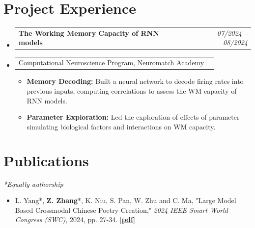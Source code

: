 \documentclass[letterpaper,11pt]{article}
\makeatletter
\newcommand{\link}[2]{\href{#1}{\textcolor{Linkblue}{\textbf{#2}}}}
\newcommand{\resumeItem}[1]{
  \item{
    {\normalsize#1 \vspace{-2pt}}
  }
}
\newcommand{\resumeProjectHeading}[2]{
    \item
    \begin{tabular*}{0.97\textwidth}{l@{\extracolsep{\fill}}r}
       #1 & \textit{#2} \\
    \end{tabular*}\vspace{-7pt}
}
\newcommand{\resumeSubHeadingListStart}{\vspace{0pt}\begin{itemize}[leftmargin=0.15in, label={}]}
\newcommand{\resumeSubHeadingListEnd}{\end{itemize}}
\newcommand{\resumeItemListStart}{\begin{itemize}}
\newcommand{\resumeItemListEnd}{\end{itemize}\vspace{-7pt}}
\makeatother
\begin{document}
\section{Project Experience}
    \resumeSubHeadingListStart

        \resumeProjectHeading
        {\textbf{The Working Memory Capacity of RNN models}}{07/2024 -- 08/2024}
        \resumeProjectHeading
        {Computational Neuroscience Program, Neuromatch Academy}{}
        \resumeItemListStart
            \resumeItem{\textbf{Memory Decoding:} Built a neural network to decode firing rates into previous inputs, computing correlations to assess the WM capacity of RNN models.}
            \resumeItem{\textbf{Parameter Exploration:} Led the exploration of effects of parameter simulating biological factors and interactions on WM capacity.}
        \resumeItemListEnd
		
        
    \resumeSubHeadingListEnd

\section{Publications}
    \hspace{10pt}\textit{*Equally authorship} 
    \vspace{-5pt}
    \begin{itemize}[leftmargin=0.15in, label={}]
        \item L. Yang*, \textbf{Z. Zhang}*, K. Niu, S. Pan, W. Zhu and C. Ma, "Large Model Based Crossmodal Chinese Poetry Creation," \textit{2024 IEEE Smart World Congress (SWC)}, 2024, pp. 27-34. [\link{https://doi.org/10.1109/SWC62898.2024.00034}{pdf}]


    \end{itemize}
    \vspace{-13pt}
    
\end{document}
